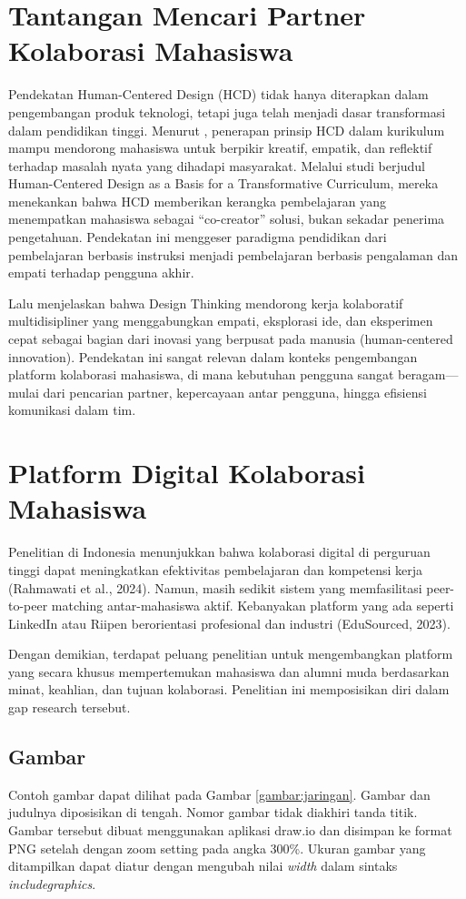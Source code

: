 \section{Tantangan Mencari Partner Kolaborasi Mahasiswa}
Pendekatan Human-Centered Design (HCD) tidak hanya diterapkan dalam pengembangan produk teknologi, tetapi juga telah menjadi dasar transformasi dalam pendidikan tinggi. Menurut \Textcite{dasHumanCenteredDesignBasis}, penerapan prinsip HCD dalam kurikulum mampu mendorong mahasiswa untuk berpikir kreatif, empatik, dan reflektif terhadap masalah nyata yang dihadapi masyarakat. Melalui studi berjudul Human-Centered Design as a Basis for a Transformative Curriculum, mereka menekankan bahwa HCD memberikan kerangka pembelajaran yang menempatkan mahasiswa sebagai “co-creator” solusi, bukan sekadar penerima pengetahuan. Pendekatan ini menggeser paradigma pendidikan dari pembelajaran berbasis instruksi menjadi pembelajaran berbasis pengalaman dan empati terhadap pengguna akhir.

Lalu \Textcite{meinelDesignThinking2011} menjelaskan bahwa Design Thinking mendorong kerja kolaboratif multidisipliner yang menggabungkan empati, eksplorasi ide, dan eksperimen cepat sebagai bagian dari inovasi yang berpusat pada manusia (human-centered innovation). Pendekatan ini sangat relevan dalam konteks pengembangan platform kolaborasi mahasiswa, di mana kebutuhan pengguna sangat beragam—mulai dari pencarian partner, kepercayaan antar pengguna, hingga efisiensi komunikasi dalam tim.

\section{Platform Digital Kolaborasi Mahasiswa}
Penelitian di Indonesia menunjukkan bahwa kolaborasi digital di perguruan tinggi dapat meningkatkan efektivitas pembelajaran dan kompetensi kerja (Rahmawati et al., 2024). Namun, masih sedikit sistem yang memfasilitasi peer-to-peer matching antar-mahasiswa aktif. Kebanyakan platform yang ada seperti LinkedIn atau Riipen berorientasi profesional dan industri (EduSourced, 2023).

Dengan demikian, terdapat peluang penelitian untuk mengembangkan platform yang secara khusus mempertemukan mahasiswa dan alumni muda berdasarkan minat, keahlian, dan tujuan kolaborasi. Penelitian ini memposisikan diri dalam gap research tersebut.

\subsection{Gambar}
Contoh gambar dapat dilihat pada Gambar \ref{gambar:jaringan}. Gambar dan judulnya diposisikan di tengah. Nomor gambar tidak diakhiri tanda titik. Gambar tersebut dibuat menggunakan aplikasi draw.io dan disimpan ke format PNG setelah dengan zoom setting pada angka 300\%. Ukuran gambar yang ditampilkan dapat diatur dengan mengubah nilai \textit{width} dalam sintaks \textit{includegraphics}.

